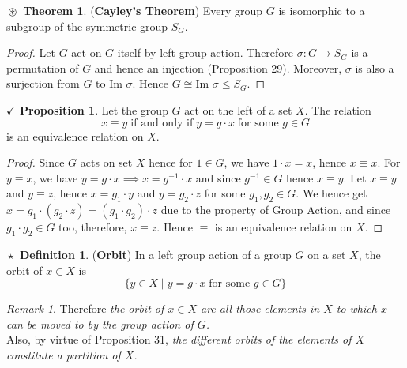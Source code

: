 \documentclass{article}
\theoremstyle{definition}
\newtheorem{definition}{$\boxed{\star}$ Definition}
\newtheorem{theorem}{$\boxed{\boxed{\circledast}}$ Theorem}
\theoremstyle{remark}
\newtheorem*{remark}{Remark}
\theoremstyle{definition}
\theoremstyle{definition}
\newtheorem{proposition}{$\checkmark$ Proposition}
\theoremstyle{definition}
\theoremstyle{proof}
\newcommand{\inv}[1]{#1^{-1}}
\newcommand{\image}[0]{\text{Im }}
\newcommand{\isomorph}{\cong}
\begin{document}
\hrulefill
\begin{theorem}
	(\textbf{Cayley's Theorem}) Every group $ G $ is isomorphic to a subgroup of the symmetric group $ S_G $.
\end{theorem}
\begin{proof}
	Let $ G $ act on $ G $ itself by left group action. Therefore $ \sigma : G \to S_G $ is a permutation of $ G $ and hence an injection (Proposition 29). Moreover, $\sigma $ is also a surjection from $ G $ to $ \image \sigma $. Hence $ G \isomorph \image \sigma \le S_G$.
\end{proof}
\hrulefill
\begin{proposition}
	Let the group $ G $ act on the left of a set $ X $. The relation 
	\[x\equiv y \;\text{if and only if}\;y=g\cdot x\;\text{for some }g\in G\]
	is an equivalence relation on $ X $.
\end{proposition}
\begin{proof}
	Since $ G $ acts on set $ X $ hence for $ 1\in G $, we have $ 1\cdot x = x $, hence $ x\equiv x $. For $ y\equiv x$, we have $ y= g\cdot x \implies x = \inv{g}\cdot x$ and since $ \inv{g}\in G $ hence $ x\equiv y $. Let $ x\equiv y $ and $ y\equiv z $, hence $ x = g_1\cdot y $ and $ y = g_2\cdot z $ for some $ g_1,g_2\in G $. We hence get $ x = g_1 \cdot (g_2\cdot z) = (g_1\cdot g_2)\cdot z$ due to the property of Group Action, and since $ g_1\cdot g_2 \in G $ too, therefore, $ x\equiv z $. Hence $ \equiv $ is an equivalence relation on $ X $.  
\end{proof}
\hrulefill
\begin{definition}
	(\textbf{Orbit}) In a left group action of a group $ G $ on a set $ X $, the orbit of $ x\in X $ is
	\[\{y\in X\;\vert \; y = g\cdot x \;\text{for some }g\in G\}\]
\end{definition}
\begin{remark}
	Therefore \emph{the orbit of $ x\in X $ are all those elements in $ X $ to which $ x $ can be moved to by the group action of $ G $.}\\
	Also, by virtue of Proposition 31, \emph{the different orbits of the elements of $ X $ constitute a partition of $ X $.}
\end{remark}
\hrulefill
\end{document}
